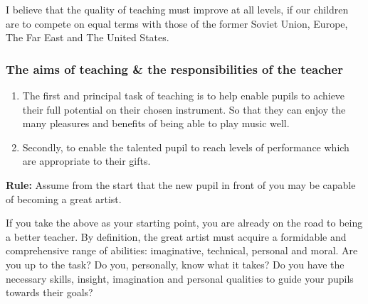 \documentclass{article}
\begin{document}
I believe that the quality of teaching must improve at all levels, if our children are to compete on equal terms with those of the former Soviet Union, Europe, The Far East and The United States.

\subsubsection{The aims of teaching \& the responsibilities of the teacher}

\begin{enumerate}
    \item The first and principal task of teaching is to help enable pupils to achieve their full potential on their chosen instrument.
        So that they can enjoy the many pleasures and benefits of being able to play music well.\footnotemark

    \item Secondly, to enable the talented pupil to reach levels of performance which are appropriate to their gifts.\footnotemark

\end{enumerate}

\textbf{Rule:} Assume from the start that the new pupil in front of you may be capable of becoming a great artist.\footnotemark
\newline
{}

If you take the above as your starting point, you are already on the road to being a better teacher.
By definition, the great artist must acquire a formidable and comprehensive range of abilities: imaginative, technical, personal and moral.
Are you up to the task?
Do you, personally, know what it takes?
Do you have the necessary skills, insight, imagination and personal qualities to guide your pupils towards their goals?
\newline
\end{document}
